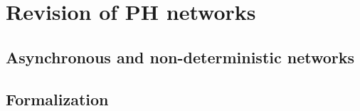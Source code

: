 
\section{Revision of PH networks}
\label{sec:ph-completion}

\subsection{Asynchronous and non-deterministic networks}

\subsection{Formalization}




